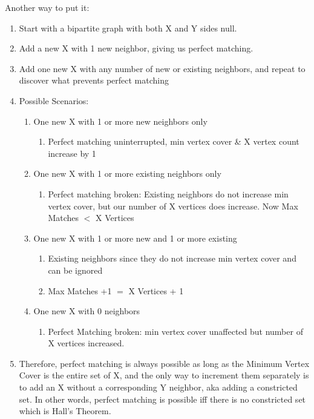 \documentclass[a4paper, 11pt]{article}
\begin{document}
Another way to put it:
\begin{enumerate}
\item 	Start with a bipartite graph with both X and Y sides null.
\item 	Add a new X with 1 new neighbor, giving us perfect matching.
\item 	Add one new X with any number of new or existing neighbors, and repeat to discover what prevents perfect matching
\item 	Possible Scenarios:
\begin{enumerate}
    \item One new X with 1 or more new neighbors only
        \begin{enumerate}
            \item Perfect matching uninterrupted, min vertex cover \& X vertex count increase by 1
        \end{enumerate}
    \item One new X with 1 or more existing neighbors only
        \begin{enumerate}
            \item Perfect matching broken: Existing neighbors do not increase min vertex cover, but our number of X vertices does increase. Now Max Matches \(<\) X Vertices
        \end{enumerate}
    \item One new X with 1 or more new and 1 or more existing
            \begin{enumerate}
            \item Existing neighbors since they do not increase min vertex cover and can be ignored
			\item Max Matches +1 \(=\) X Vertices + 1
        \end{enumerate}
    \item One new X with 0 neighbors
            \begin{enumerate}
            \item Perfect Matching broken: min vertex cover unaffected but number of X vertices increased.
        \end{enumerate}
\end{enumerate}
\item Therefore, perfect matching is always possible as long as the Minimum Vertex Cover is the entire set of X, and the only way to increment them separately is to add an X without a corresponding Y neighbor, aka adding a constricted set. In other words, perfect matching is possible iff there is no constricted set which is Hall's Theorem.
\end{enumerate}
\end{document}
